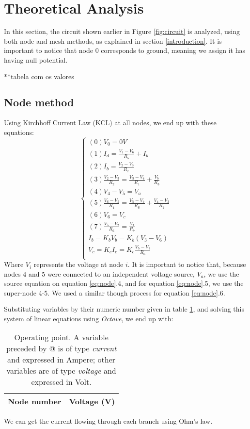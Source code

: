 \section{Theoretical Analysis}
\label{sec:analysis}

In this section, the circuit shown earlier in Figure \ref{fig:circuit} is analyzed, using both node and mesh methods, as explained in section \ref{introduction}. It is important to notice that node 0 corresponds to ground, meaning we assign it has having null potential.
\par
**tabela com os valores

\subsection{Node method}
Using Kirchhoff Current Law (KCL) at all nodes, we end up with these equations:
\begin{equation}\label{eq:node}
  \begin{cases}
  (0) V_0 = 0V \\
  (1) I_d = \frac{V_1 - V_6}{R_5} + I_b \\
  (2) I_b = \frac{V_2 - V_3}{R_2} \\
  (3) \frac{V_2 - V_3}{R_2} = \frac{V_3 - V_4}{R_1} + \frac{V_b}{R_3} \\
  (4) V_4 - V_5 = V_a \\
  (5) \frac{V_6 - V_5}{R_4} = \frac{V_5 - V_7}{R_6} + \frac{V_4 - V_3}{R_1} \\ %
  (6) V_6 = V_c \\
  (7) \frac{V_5 - V_7}{R_6} = \frac{V_7}{R_7} \\
  I_b = K_bV_b = K_b(V_3 - V_6) \\
  V_c = K_cI_c = K_c \frac{V_5 - V_7}{R_6} \\
\end{cases}
\end{equation}
Where $V_i$ represents the voltage at node $i$. It is important to notice that, because nodes 4 and 5 were connected to an independent voltage source, $V_a$, we use the source equation on equation \ref{eq:node}.4, and for equation \ref{eq:node}.5, we use the super-node 4-5. We used a similar though process for equation \ref{eq:node}.6.
\par
Substituting variables by their numeric number given in table \ref{tab:node}, and solving this system of linear equations using \textit{Octave}, we end up with:
\begin{table}[H]
  \centering
  \begin{tabular}{|l|r|}
    \hline    
    {\bf Node number} & {\bf Voltage (V)} \\ \hline
    
  \end{tabular}
  \caption{Operating point. A variable preceded by @ is of type {\em current}
    and expressed in Ampere; other variables are of type {\it voltage} and expressed in
    Volt.}
  \label{tab:node}
\end{table}
\par
We can get the current flowing through each branch using Ohm's law.

